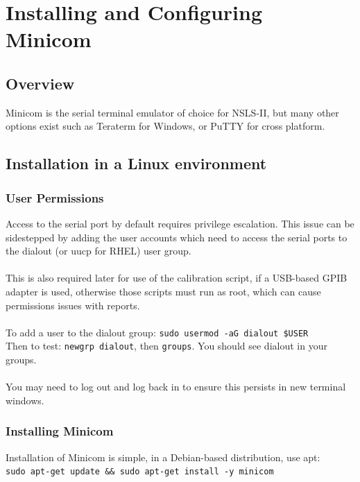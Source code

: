 
\chapter{Installing and Configuring Minicom}
\label{chap:Installing and Configuring Minicom}
\section{Overview}
Minicom is the serial terminal emulator of choice for NSLS-II, but many other options exist such as Teraterm for Windows, or PuTTY for cross platform. 

\section{Installation in a Linux environment}
\subsection*{User Permissions}
Access to the serial port by default requires privilege escalation. This issue can be sidestepped by adding the user accounts which need to access the serial ports to the dialout (or uucp for RHEL) user group.\\\\
This is also required later for use of the calibration script, if a USB-based GPIB adapter is used, otherwise those scripts must run as root, which can cause permissions issues with reports.\\\\
To add a user to the dialout group: \texttt{sudo usermod -aG dialout \$USER}\\
Then to test: \texttt{newgrp dialout}, then \texttt{groups}. You should see dialout in your groups.\\\\
You may need to log out and log back in to ensure this persists in new terminal windows. 

\subsection{Installing Minicom}
Installation of Minicom is simple, in a Debian-based distribution, use apt:\\
\texttt{sudo apt-get update \&\& sudo apt-get install -y minicom}\\

